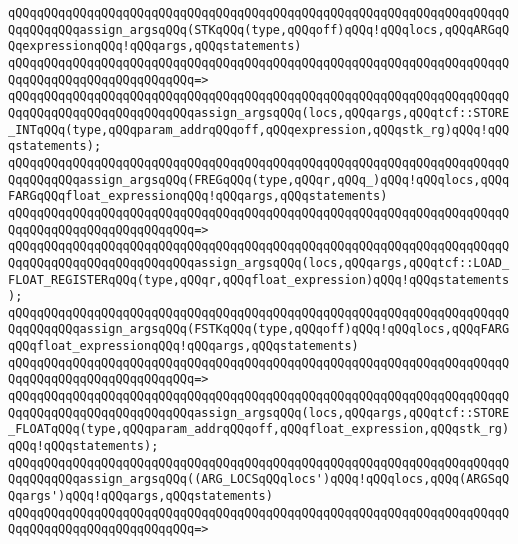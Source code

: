 \newline
\verb|qQQqqQQqqQQqqQQqqQQqqQQqqQQqqQQqqQQqqQQqqQQqqQQqqQQqqQQqqQQqqQQqqQQqqQQqqQQqqQQqassign_argsqQQq(STKqQQq(type,qQQqoff)qQQq!qQQqlocs,qQQqARGqQQqexpressionqQQq!qQQqargs,qQQqstatements)|\newline
\verb|qQQqqQQqqQQqqQQqqQQqqQQqqQQqqQQqqQQqqQQqqQQqqQQqqQQqqQQqqQQqqQQqqQQqqQQqqQQqqQQqqQQqqQQqqQQqqQQq=>|\newline
\verb|qQQqqQQqqQQqqQQqqQQqqQQqqQQqqQQqqQQqqQQqqQQqqQQqqQQqqQQqqQQqqQQqqQQqqQQqqQQqqQQqqQQqqQQqqQQqqQQqassign_argsqQQq(locs,qQQqargs,qQQqtcf::STORE_INTqQQq(type,qQQqparam_addrqQQqoff,qQQqexpression,qQQqstk_rg)qQQq!qQQqstatements);|\newline
\newline
\verb|qQQqqQQqqQQqqQQqqQQqqQQqqQQqqQQqqQQqqQQqqQQqqQQqqQQqqQQqqQQqqQQqqQQqqQQqqQQqqQQqassign_argsqQQq(FREGqQQq(type,qQQqr,qQQq_)qQQq!qQQqlocs,qQQqFARGqQQqfloat_expressionqQQq!qQQqargs,qQQqstatements)|\newline
\verb|qQQqqQQqqQQqqQQqqQQqqQQqqQQqqQQqqQQqqQQqqQQqqQQqqQQqqQQqqQQqqQQqqQQqqQQqqQQqqQQqqQQqqQQqqQQqqQQq=>|\newline
\verb|qQQqqQQqqQQqqQQqqQQqqQQqqQQqqQQqqQQqqQQqqQQqqQQqqQQqqQQqqQQqqQQqqQQqqQQqqQQqqQQqqQQqqQQqqQQqqQQqassign_argsqQQq(locs,qQQqargs,qQQqtcf::LOAD_FLOAT_REGISTERqQQq(type,qQQqr,qQQqfloat_expression)qQQq!qQQqstatements);|\newline
\newline
\verb|qQQqqQQqqQQqqQQqqQQqqQQqqQQqqQQqqQQqqQQqqQQqqQQqqQQqqQQqqQQqqQQqqQQqqQQqqQQqqQQqassign_argsqQQq(FSTKqQQq(type,qQQqoff)qQQq!qQQqlocs,qQQqFARGqQQqfloat_expressionqQQq!qQQqargs,qQQqstatements)|\newline
\verb|qQQqqQQqqQQqqQQqqQQqqQQqqQQqqQQqqQQqqQQqqQQqqQQqqQQqqQQqqQQqqQQqqQQqqQQqqQQqqQQqqQQqqQQqqQQqqQQq=>|\newline
\verb|qQQqqQQqqQQqqQQqqQQqqQQqqQQqqQQqqQQqqQQqqQQqqQQqqQQqqQQqqQQqqQQqqQQqqQQqqQQqqQQqqQQqqQQqqQQqqQQqassign_argsqQQq(locs,qQQqargs,qQQqtcf::STORE_FLOATqQQq(type,qQQqparam_addrqQQqoff,qQQqfloat_expression,qQQqstk_rg)qQQq!qQQqstatements);|\newline
\newline
\verb|qQQqqQQqqQQqqQQqqQQqqQQqqQQqqQQqqQQqqQQqqQQqqQQqqQQqqQQqqQQqqQQqqQQqqQQqqQQqqQQqassign_argsqQQq((ARG_LOCSqQQqlocs')qQQq!qQQqlocs,qQQq(ARGSqQQqargs')qQQq!qQQqargs,qQQqstatements)|\newline
\verb|qQQqqQQqqQQqqQQqqQQqqQQqqQQqqQQqqQQqqQQqqQQqqQQqqQQqqQQqqQQqqQQqqQQqqQQqqQQqqQQqqQQqqQQqqQQqqQQq=>|\newline
